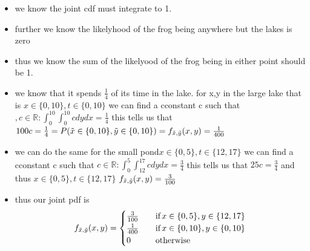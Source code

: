 \documentclass[12pt,twoside]{article}
\begin{document}
\begin{enumerate}
\begin{enumerate}
\begin{itemize}
    \item we know the joint cdf must integrate to 1. 
    \item further we know the likelyhood of the frog being anywhere but the lakes is zero
    \item thus we know the sum of the likelyood of the frog being in either point should be 1. 
    \item we know that it spends $\frac{1}{4}$ of its time in the lake. for x,y in the large lake that is $x\in\{0,10\},t\in\{0,10\}$ we can find a cconstant c such that   $,c\in\mathbb{R}:\int_{0}^{10}\int_{0}^{10}cdydx=\frac{1}{4}$ this tells us that $100c=\frac{1}{4}=P(\Tilde{x}\in\{0,10\},\Tilde{y}\in\{0,10\})=f_{\Tilde{x},\Tilde{y}}(x,y)=\frac{1}{400}$
    \item we can do the same for the small pond$x\in\{0,5\},t\in\{12,17\}$ we can find a cconstant c such that   $c\in\mathbb{R}:\int_{0}^{5}\int_{12}^{17}cdydx=\frac{3}{4}$ this tells us that $25c=\frac{3}{4}$ and thus $x\in\{0,5\},t\in\{12,17\}$ $f_{\Tilde{x},\Tilde{y}}(x,y)=\frac{3}{100}$
    \item thus our joint pdf is 
\begin{equation*}
f_{\Tilde{x},\Tilde{y}}(x,y)=\begin{cases}
          \frac{3}{100} \quad &\text{if} \, x \in \{0,5\},y \in \{12,17\} \\
                \frac{1}{400} \quad &\text{if} \, x \in \{0,10\},y \in \{0,10\} \\
                0 \quad & \text{otherwise}
     \end{cases}
\end{equation*}
\end{itemize}
\\






\end{enumerate}
\end{enumerate}
\end{document}

